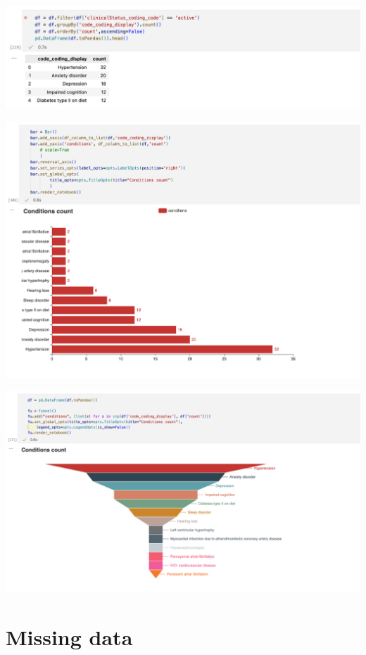 \documentclass[11pt, oneside]{article}
\begin{document}
\begin{center}
\includegraphics[scale=0.4]{1_conditions.png}
\end{center}
\begin{center}
\includegraphics[scale=0.4]{1_bars.png}
\end{center}
\begin{center}
\includegraphics[scale=0.4]{1_funnel.png}
\end{center}

\section{Missing data}
\end{document}
